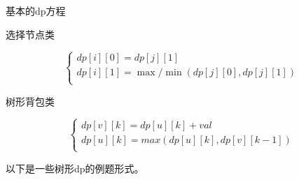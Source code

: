 基本的dp方程

选择节点类

$$
\begin{cases} dp[i][0]=dp[j][1] \\ dp[i][1]=\max/\min(dp[j][0],dp[j][1])\\ \end{cases}
$$

树形背包类

$$
\begin{cases} dp[v][k]=dp[u][k]+val\\ dp[u][k]=max(dp[u][k],dp[v][k-1])\\ \end{cases}
$$

以下是一些树形dp的例题形式。